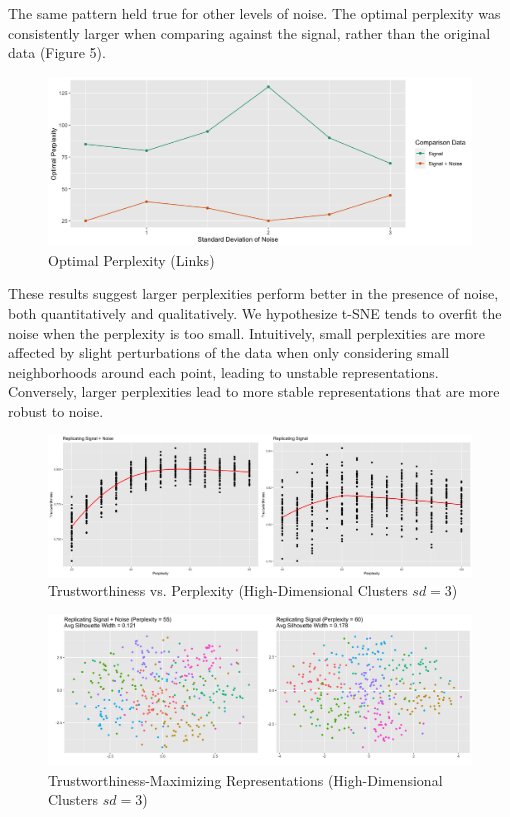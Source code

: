\documentclass{article}
\begin{document}
The same pattern held true for other levels of noise. The optimal perplexity was consistently larger when comparing against the signal, rather than the original data (Figure 5).

\renewcommand{\thefigure}{5}
\begin{figure}[t]
\centering
\includegraphics[scale=0.38]{optimal_perp_links}
\caption{Optimal Perplexity (Links)}
\end{figure}

These results suggest larger perplexities perform better in the presence of noise, both quantitatively and qualitatively. We hypothesize t-SNE tends to overfit the noise when the perplexity is too small. Intuitively, small perplexities are more affected by slight perturbations of the data when only considering small neighborhoods around each point, leading to unstable representations. Conversely, larger perplexities lead to more stable representations that are more robust to noise.

\renewcommand{\thefigure}{6}
\begin{figure}[b]
\centering
\includegraphics[scale=0.22]{trust_plot_high_dim}
\caption{Trustworthiness vs. Perplexity (High-Dimensional Clusters $sd = 3$)}
\end{figure}

\renewcommand{\thefigure}{7}
\begin{figure}[t]
\centering
\includegraphics[scale=0.14]{best_rep_high_dim}
\caption{Trustworthiness-Maximizing Representations (High-Dimensional Clusters $sd = 3$)}
\end{figure}
\end{document}
